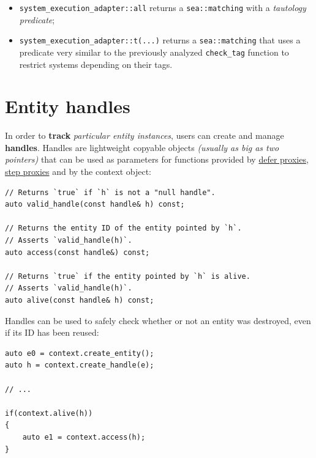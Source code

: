 \documentclass[oneside, 12pt, a4paper, openany]{book}
\begin{document}
\begin{itemize}
\item
  \texttt{system_execution_adapter::all}
  returns a
  \texttt{sea::matching}
  with a \emph{tautology predicate};
\item
  \texttt{system_execution_adapter::t(...)}
  returns a
  \texttt{sea::matching}
  that uses a predicate very similar to the previously analyzed
  \texttt{check_tag}
  function to restrict systems depending on their tags.
\end{itemize}

\section{Entity handles}\label{entity-handles}

In order to \textbf{track} \emph{particular entity instances}, users can
create and manage \textbf{handles}. Handles are lightweight copyable
objects \emph{(usually as big as two pointers)} that can be used as
parameters for functions provided by
\protect\hyperlink{proxies_defer}{defer proxies},
\protect\hyperlink{proxies_step}{step proxies} and by the context
object:

\begin{verbatim}
// Returns `true` if `h` is not a "null handle".
auto valid_handle(const handle& h) const;

// Returns the entity ID of the entity pointed by `h`.
// Asserts `valid_handle(h)`.
auto access(const handle&) const;

// Returns `true` if the entity pointed by `h` is alive.
// Asserts `valid_handle(h)`.
auto alive(const handle& h) const;
\end{verbatim}

Handles can be used to safely check whether or not an entity was
destroyed, even if its ID has been reused:

\begin{verbatim}
auto e0 = context.create_entity();
auto h = context.create_handle(e);

// ...

if(context.alive(h))
{
    auto e1 = context.access(h);
}
\end{verbatim}
\end{document}
